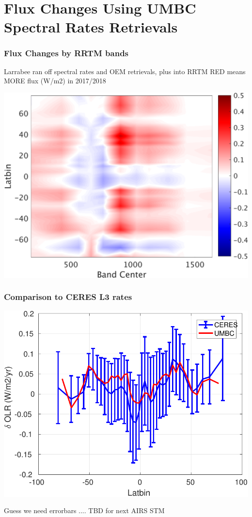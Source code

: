 \documentclass[10pt,t]{beamer}
\begin{document}
\section{Flux Changes Using UMBC Spectral Rates Retrievals}
\begin{frame}
  \frametitle{Flux Changes by RRTM bands}
  Larrabee ran off spectral rates and OEM retrievals, plus into RRTM
  RED means MORE flux (W/m2) in 2017/2018 \newline
  \begin{center}
    \noindent\includegraphics[width=0.625\linewidth]{Figs/umbc_vs_band_fluxrates.png}
  \end{center}
\end{frame}
\begin{frame}
  \frametitle{Comparison to CERES L3 rates}
  \begin{center}
    \noindent\includegraphics[width=0.625\linewidth]{Figs/umbc_vs_ceres_fluxrates.pdf}
  \end{center}
 Guess we need errorbars .... TBD for next AIRS STM
\end{frame}
\end{document}

